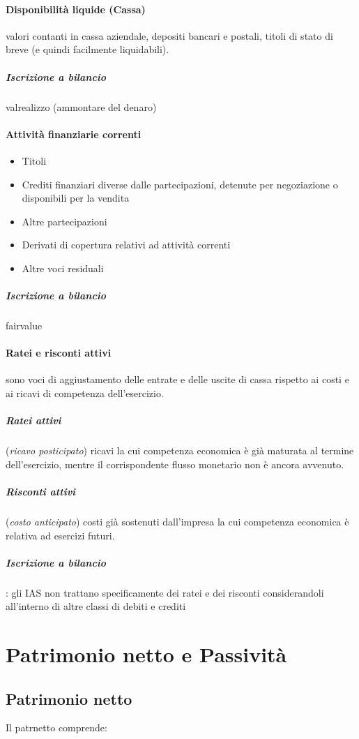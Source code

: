 \documentclass[10pt,a4paper,fleqn,oneside]{book}
\begin{document}
\paragraph{Disponibilità liquide (Cassa)} valori contanti in cassa aziendale,
depositi bancari e postali, titoli di stato di breve (e quindi facilmente liquidabili).
\subparagraph{Iscrizione a bilancio} \gls{valrealizzo} (ammontare del denaro)

\paragraph{Attività finanziarie correnti}
\begin{itemize}
    \item Titoli
    \item Crediti finanziari 
    diverse dalle partecipazioni, detenute per negoziazione o disponibili per la vendita
    \item Altre partecipazioni
    \item Derivati di copertura relativi ad attività correnti
    \item Altre voci residuali
\end{itemize}
\subparagraph{Iscrizione a bilancio} \gls{fairvalue}

\paragraph{Ratei e risconti attivi} sono voci di aggiustamento delle entrate e
delle uscite di cassa rispetto ai costi e ai ricavi di competenza dell’esercizio.

\subparagraph{Ratei attivi} (\emph{ricavo posticipato}) ricavi la cui competenza economica è già maturata al 
termine dell’esercizio, mentre il corrispondente flusso monetario non è ancora avvenuto.
\subparagraph{Risconti attivi} (\emph{costo anticipato}) costi già sostenuti dall’impresa la cui competenza
economica è relativa ad esercizi futuri.
\subparagraph{Iscrizione a bilancio}: gli IAS non trattano specificamente dei
ratei e dei risconti considerandoli all'interno di altre classi di debiti e crediti

\section{Patrimonio netto e Passività}

\subsection{Patrimonio netto}
Il \gls{patrnetto} comprende:
\end{document}
